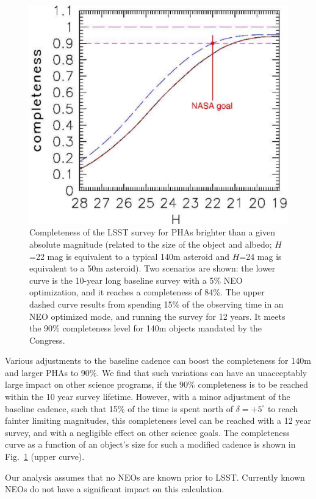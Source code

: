 \documentclass{emulateapj}
\begin{document}
\begin{figure}
\includegraphics[width=1.0\hsize,clip]{Cneo.pdf}
\caption{Completeness of the LSST survey for PHAs brighter than a given absolute
magnitude (related to the size of the object and albedo; 
$H$=22 mag is equivalent to a typical 140m asteroid and $H$=24 mag is
equivalent to a 50m asteroid). Two scenarios are shown: the lower curve is the 
10-year long baseline survey with a 5\% NEO optimization, and it reaches a 
completeness of 84\%. The upper dashed curve results from spending 15\% of the 
observing time in an NEO optimized mode, and running the survey for 12 years.  
It meets the 90\% completeness level for 140m objects mandated by the Congress.} 
\label{Fig:Cneo}
\end{figure}

Various adjustments to the baseline cadence can boost the completeness for
140m and larger PHAs to 90\%. We find that such variations can have an unacceptably 
large impact on other science programs, if the 90\% completeness is to be reached 
within the 10 year survey lifetime. However, with a minor adjustment of the 
baseline cadence, such that 15\% of the time is spent north of $\delta
= +5^\circ$ to reach
fainter limiting magnitudes, this completeness level can be reached
with a 12 year 
survey, and with a negligible effect on other science goals. The completeness 
curve as a function of an object's size for such a modified cadence is shown in 
Fig.~\ref{Fig:Cneo} (upper curve).

Our analysis assumes that no NEOs are known prior to LSST. Currently known
NEOs do not have a significant impact on this calculation. 
\end{document}
